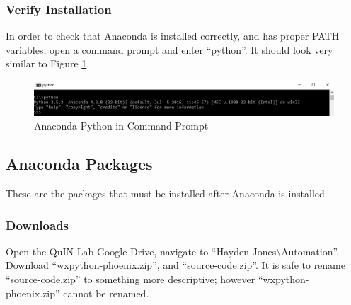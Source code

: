 \documentclass[11pt, letterpaper, titlepage]{article}
\begin{document}
\subsubsection{Verify Installation} %
In order to check that Anaconda is installed correctly, and has proper PATH variables, open a command prompt and enter ``python''.
It should look very similar to Figure \ref{fig:anaconda_prompt}.
\begin{figure}[h]
    \begin{center}
    \includegraphics[scale=.65]{anaconda_prompt.png}
    \caption{Anaconda Python in Command Prompt}
    \label{fig:anaconda_prompt}
    \end{center}
\end{figure}
\subsection{Anaconda Packages} \label{anacondapkgs} %
These are the packages that must be installed after Anaconda is installed.
\subsubsection{Downloads} %
Open the QuIN Lab Google Drive, navigate to ``Hayden Jones\textbackslash Automation''.
Download ``wxpython-phoenix.zip'', and ``source-code.zip''.
It is safe to rename ``source-code.zip'' to something more descriptive; however ``wxpython-phoenix.zip'' cannot be renamed.
\end{document}
